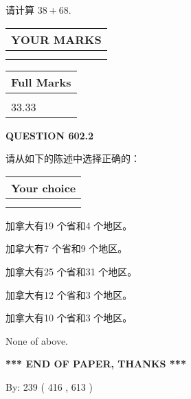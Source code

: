\documentclass{ctexart}
\begin{document}
  
 
请计算 $ %
38 +  %
68 $.
 

 

 
  
\vspace{0.2in}
  
\noindent\begin{tabular}{|l|}
\hline
 YOUR MARKS  \\
\hline
 \\ 
 \\ 
\hline
\end{tabular}
\hspace{0.05in} \begin{tabular}{|l|}
\hline
 Full Marks  \\
\hline
 \\ 
33.33 \\
\hline
\end{tabular}
{\textbf{\Large{QUESTION
602.2 
}}}
  
  
请从如下的陈述中选择正确的：
  
  
\noindent\hspace{3.0in} \begin{tabular}{|l|}
\hline
Your choice \\
\hline
 \\ 
 \\ 
\hline
\end{tabular}
  
  
 
 
加拿大有19 个省和4 个地区。
 
 
加拿大有7 个省和9 个地区。
 
 
加拿大有25 个省和31 个地区。
 
 
加拿大有12 个省和3 个地区。
 
 
加拿大有10 个省和3 个地区。
 
 
 None of above.
 
 
   
   
 \vspace{0.2in}
 
   
   
   
   
\vspace{1.0in} 
{\textbf{\large{ *** END OF PAPER, THANKS *** }}} 
   
   
\hspace{1.0in} By: 
 239 ( 416 ,  613 )
   
\end{document}

